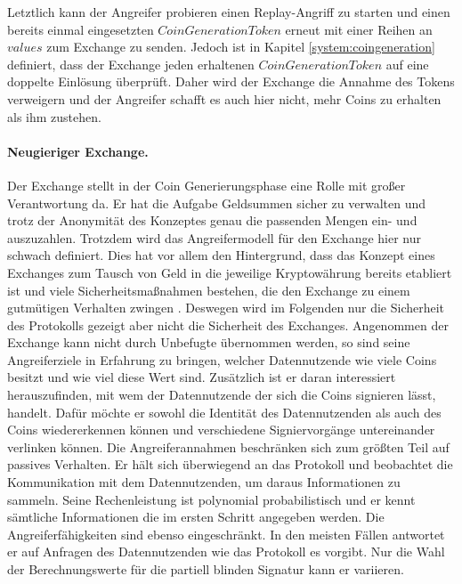 \documentclass[
	fontsize=12pt,
	headings=small,
	parskip=half,           %
	bibliography=totoc,
	numbers=noenddot,       %
	open=any,               %
]{scrreprt}
\begin{document}
Letztlich kann der Angreifer probieren einen Replay-Angriff zu starten und einen bereits einmal eingesetzten $CoinGenerationToken$ erneut mit einer Reihen an $values$ zum Exchange zu senden. Jedoch ist in Kapitel \ref{system:coingeneration} definiert, dass der Exchange jeden erhaltenen $CoinGenerationToken$ auf eine doppelte Einlösung überprüft. Daher wird der Exchange die Annahme des Tokens verweigern und der Angreifer schafft es auch hier nicht, mehr Coins zu erhalten als ihm zustehen.\\

\paragraph{Neugieriger Exchange.}
Der Exchange stellt in der Coin Generierungsphase eine Rolle mit großer Verantwortung da. Er hat die Aufgabe Geldsummen sicher zu verwalten und trotz der Anonymität des Konzeptes genau die passenden Mengen ein- und auszuzahlen. Trotzdem wird das Angreifermodell für den Exchange hier nur schwach definiert. Dies hat vor allem den Hintergrund, dass das Konzept eines Exchanges zum Tausch von Geld in die jeweilige Kryptowährung bereits etabliert ist und viele Sicherheitsmaßnahmen bestehen, die den Exchange zu einem gutmütigen Verhalten zwingen \cite{gnu-burdges2016enabling,kim2018risk,baum2021p2dex}. Deswegen wird im Folgenden nur die Sicherheit des Protokolls gezeigt aber nicht die Sicherheit des Exchanges.
Angenommen der Exchange kann nicht durch Unbefugte übernommen werden, so sind seine Angreiferziele in Erfahrung zu bringen, welcher Datennutzende wie viele Coins besitzt und wie viel diese Wert sind. Zusätzlich ist er daran interessiert herauszufinden, mit wem der Datennutzende der sich die Coins signieren lässt, handelt. Dafür möchte er sowohl die Identität des Datennutzenden als auch des Coins wiedererkennen können und verschiedene Signiervorgänge untereinander verlinken können. Die Angreiferannahmen beschränken sich zum größten Teil auf passives Verhalten. Er hält sich überwiegend an das Protokoll und beobachtet die Kommunikation mit dem Datennutzenden, um daraus Informationen zu sammeln. Seine Rechenleistung ist polynomial probabilistisch und er kennt sämtliche Informationen die im ersten Schritt angegeben werden. Die Angreiferfähigkeiten sind ebenso eingeschränkt. In den meisten Fällen antwortet er auf Anfragen des Datennutzenden wie das Protokoll es vorgibt. Nur die Wahl der Berechnungswerte für die partiell blinden Signatur kann er variieren.\\
\end{document}
